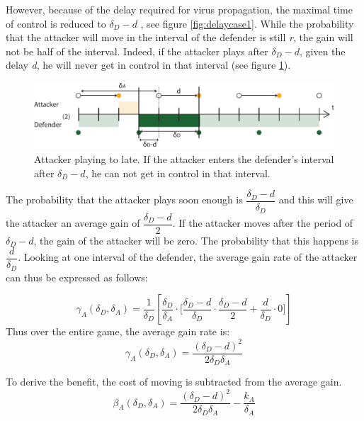 However, because of the delay required for virus propagation, the maximal time of control is reduced to $\delta_{D}-d$ , see figure \ref{fig:delaycase1}. While the probability that the attacker will move in the interval of the defender is still \textit{r}, the gain will not be half of the interval. Indeed, if the attacker plays after $\delta_{D}-d$, given the delay \textit{d}, he will never get in control in that interval (see figure \ref{tijdens interval}). 
\begin{figure}[hbtp]
\centering
\includegraphics[scale=0.7]{../../doc/template/Images/delaydtijdens.pdf}
\caption{Attacker playing to late. If the attacker enters the defender's interval after $\delta_{D} -d$, he can not get in control in that interval.}
\label{tijdens interval}
\end{figure}The probability that the attacker plays soon enough is $\dfrac{\delta_{D}-d}{\delta_{D}}$ and this will give the attacker an average gain of $\dfrac{\delta_{D}-d}{2}$. If the attacker moves after the period of $\delta_{D}-d$, the gain of the attacker will be zero. The probability that this happens is  $\dfrac{d}{\delta_{D}}$. Looking at one interval of the defender, the average gain rate of the attacker can thus be expressed as follows:


\begin{equation*}
\gamma_{A}(\delta_{D},\delta_{A}) = \dfrac {1}{\delta_{D}} [ \dfrac{\delta_{D}}{\delta_{A}} \cdot \big[ \dfrac{\delta_{D}-d}{\delta_{D}} \cdot \dfrac{\delta_{D}-d}{2} + \dfrac{d}{\delta_{D}} \cdot 0 \big] ]
\end{equation*}
Thus over the entire game, the average gain rate is:
\begin{equation*}
\gamma_{A}(\delta_{D},\delta_{A}) = \dfrac{(\delta_{D} -d)^{2}}{2\delta_{D}\delta_{A}}
\end{equation*}

To derive the benefit, the cost of moving is subtracted from the average gain. 
\begin{equation*}
\beta_{A}(\delta_{D},\delta_{A}) = \dfrac { (\delta_{D}-d) ^{2}} {2 \delta_{D}  \delta_{A}} - \dfrac{k_{A}}{\delta_{A}}
\end{equation*}


